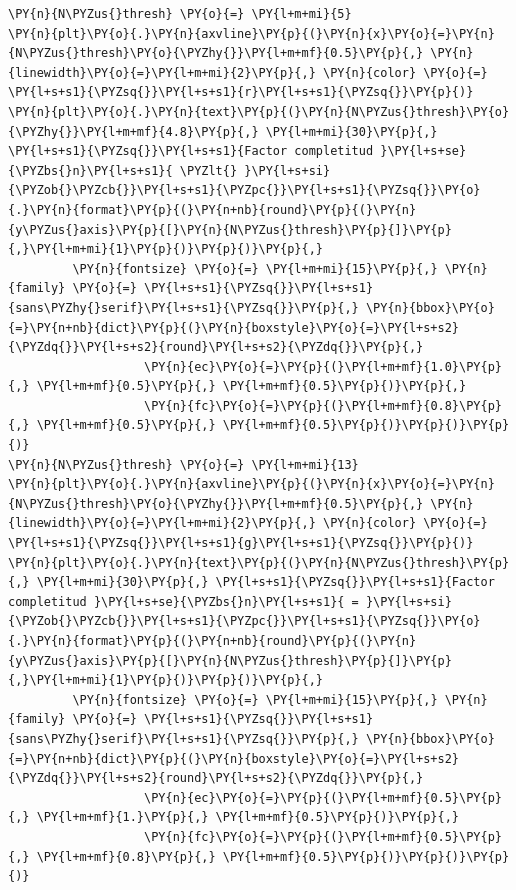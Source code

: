 \begin{tcolorbox}[breakable, size=fbox, boxrule=1pt, pad at break*=1mm,colback=cellbackground, colframe=cellborder]
\begin{Verbatim}[commandchars=\\\{\}]
\PY{n}{N\PYZus{}thresh} \PY{o}{=} \PY{l+m+mi}{5}
\PY{n}{plt}\PY{o}{.}\PY{n}{axvline}\PY{p}{(}\PY{n}{x}\PY{o}{=}\PY{n}{N\PYZus{}thresh}\PY{o}{\PYZhy{}}\PY{l+m+mf}{0.5}\PY{p}{,} \PY{n}{linewidth}\PY{o}{=}\PY{l+m+mi}{2}\PY{p}{,} \PY{n}{color} \PY{o}{=} \PY{l+s+s1}{\PYZsq{}}\PY{l+s+s1}{r}\PY{l+s+s1}{\PYZsq{}}\PY{p}{)}
\PY{n}{plt}\PY{o}{.}\PY{n}{text}\PY{p}{(}\PY{n}{N\PYZus{}thresh}\PY{o}{\PYZhy{}}\PY{l+m+mf}{4.8}\PY{p}{,} \PY{l+m+mi}{30}\PY{p}{,} \PY{l+s+s1}{\PYZsq{}}\PY{l+s+s1}{Factor completitud }\PY{l+s+se}{\PYZbs{}n}\PY{l+s+s1}{ \PYZlt{} }\PY{l+s+si}{\PYZob{}\PYZcb{}}\PY{l+s+s1}{\PYZpc{}}\PY{l+s+s1}{\PYZsq{}}\PY{o}{.}\PY{n}{format}\PY{p}{(}\PY{n+nb}{round}\PY{p}{(}\PY{n}{y\PYZus{}axis}\PY{p}{[}\PY{n}{N\PYZus{}thresh}\PY{p}{]}\PY{p}{,}\PY{l+m+mi}{1}\PY{p}{)}\PY{p}{)}\PY{p}{,}
         \PY{n}{fontsize} \PY{o}{=} \PY{l+m+mi}{15}\PY{p}{,} \PY{n}{family} \PY{o}{=} \PY{l+s+s1}{\PYZsq{}}\PY{l+s+s1}{sans\PYZhy{}serif}\PY{l+s+s1}{\PYZsq{}}\PY{p}{,} \PY{n}{bbox}\PY{o}{=}\PY{n+nb}{dict}\PY{p}{(}\PY{n}{boxstyle}\PY{o}{=}\PY{l+s+s2}{\PYZdq{}}\PY{l+s+s2}{round}\PY{l+s+s2}{\PYZdq{}}\PY{p}{,}
                   \PY{n}{ec}\PY{o}{=}\PY{p}{(}\PY{l+m+mf}{1.0}\PY{p}{,} \PY{l+m+mf}{0.5}\PY{p}{,} \PY{l+m+mf}{0.5}\PY{p}{)}\PY{p}{,}
                   \PY{n}{fc}\PY{o}{=}\PY{p}{(}\PY{l+m+mf}{0.8}\PY{p}{,} \PY{l+m+mf}{0.5}\PY{p}{,} \PY{l+m+mf}{0.5}\PY{p}{)}\PY{p}{)}\PY{p}{)}
\PY{n}{N\PYZus{}thresh} \PY{o}{=} \PY{l+m+mi}{13}
\PY{n}{plt}\PY{o}{.}\PY{n}{axvline}\PY{p}{(}\PY{n}{x}\PY{o}{=}\PY{n}{N\PYZus{}thresh}\PY{o}{\PYZhy{}}\PY{l+m+mf}{0.5}\PY{p}{,} \PY{n}{linewidth}\PY{o}{=}\PY{l+m+mi}{2}\PY{p}{,} \PY{n}{color} \PY{o}{=} \PY{l+s+s1}{\PYZsq{}}\PY{l+s+s1}{g}\PY{l+s+s1}{\PYZsq{}}\PY{p}{)}
\PY{n}{plt}\PY{o}{.}\PY{n}{text}\PY{p}{(}\PY{n}{N\PYZus{}thresh}\PY{p}{,} \PY{l+m+mi}{30}\PY{p}{,} \PY{l+s+s1}{\PYZsq{}}\PY{l+s+s1}{Factor completitud }\PY{l+s+se}{\PYZbs{}n}\PY{l+s+s1}{ = }\PY{l+s+si}{\PYZob{}\PYZcb{}}\PY{l+s+s1}{\PYZpc{}}\PY{l+s+s1}{\PYZsq{}}\PY{o}{.}\PY{n}{format}\PY{p}{(}\PY{n+nb}{round}\PY{p}{(}\PY{n}{y\PYZus{}axis}\PY{p}{[}\PY{n}{N\PYZus{}thresh}\PY{p}{]}\PY{p}{,}\PY{l+m+mi}{1}\PY{p}{)}\PY{p}{)}\PY{p}{,}
         \PY{n}{fontsize} \PY{o}{=} \PY{l+m+mi}{15}\PY{p}{,} \PY{n}{family} \PY{o}{=} \PY{l+s+s1}{\PYZsq{}}\PY{l+s+s1}{sans\PYZhy{}serif}\PY{l+s+s1}{\PYZsq{}}\PY{p}{,} \PY{n}{bbox}\PY{o}{=}\PY{n+nb}{dict}\PY{p}{(}\PY{n}{boxstyle}\PY{o}{=}\PY{l+s+s2}{\PYZdq{}}\PY{l+s+s2}{round}\PY{l+s+s2}{\PYZdq{}}\PY{p}{,}
                   \PY{n}{ec}\PY{o}{=}\PY{p}{(}\PY{l+m+mf}{0.5}\PY{p}{,} \PY{l+m+mf}{1.}\PY{p}{,} \PY{l+m+mf}{0.5}\PY{p}{)}\PY{p}{,}
                   \PY{n}{fc}\PY{o}{=}\PY{p}{(}\PY{l+m+mf}{0.5}\PY{p}{,} \PY{l+m+mf}{0.8}\PY{p}{,} \PY{l+m+mf}{0.5}\PY{p}{)}\PY{p}{)}\PY{p}{)}


\end{Verbatim}
\end{tcolorbox}
